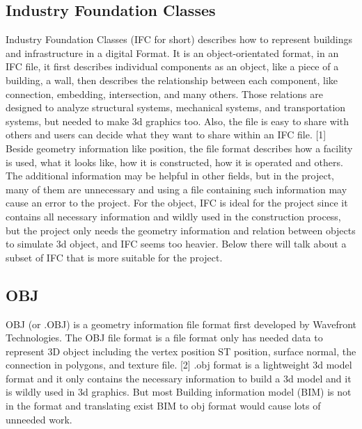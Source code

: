 \documentclass[10pt,letter paper]{article}
\begin{document}
\subsection{Industry Foundation Classes}
Industry Foundation Classes (IFC for short) describes how to represent buildings and infrastructure in a digital Format. It is an object-orientated format, in an IFC file, it first describes individual components as an object, like a piece of a building, a wall, then describes the relationship between each component, like connection, embedding, intersection, and many others. Those relations are designed to analyze structural systems, mechanical systems, and transportation systems, but needed to make 3d graphics too. Also, the file is easy to share with others and users can decide what they want to share within an IFC file. [1]\newline
\noindent
\newline
Beside geometry information like position, the file format describes how a facility is used, what it looks like, how it is constructed, how it is operated and others. The additional information may be helpful in other fields, but in the project, many of them are unnecessary and using a file containing such information may cause an error to the project.\newline
\noindent
\newline
For the object, IFC is ideal for the project since it contains all necessary information and wildly used in the construction process, but the project only needs the geometry information and relation between objects to simulate 3d object, and IFC seems too heavier. Below there will talk about a subset of IFC that is more suitable for the project.
\subsection{OBJ}
OBJ (or .OBJ) is a geometry information file format first developed by Wavefront Technologies. The OBJ file format is a file format only has needed data to represent 3D object including the vertex position ST position, surface normal, the connection in polygons, and texture file. [2]\newline
\noindent
\newline
.obj format is a lightweight 3d model format and it only contains the necessary information to build a 3d model and it is wildly used in 3d graphics. But most Building information model (BIM) is not in the format and translating exist BIM to obj format would cause lots of unneeded work.
\end{document}
